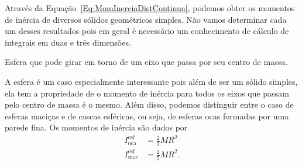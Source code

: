 Através da Equação~\eqref{Eq:MomInerciaDistContinua}, podemos obter os momentos de inércia de diversos sólidos geométricos simples. Não vamos determinar cada um desses resultados pois em geral é necessário um conhecimento de cálculo de integrais em duas e três dimensões.

\begin{description}

\begin{marginfigure}
\centering
{}
\caption{Esfera que pode girar em torno de um eixo que passa por seu centro de massa.}
\end{marginfigure}

    \item[Esfera:] A esfera é um caso especialmente interessante pois além de ser um sólido simples, ela tem a propriedade de o momento de inércia para todos os eixos que passam pelo centro de massa é o mesmo. Além disso, podemos distinguir entre o caso de esferas maciças e de cascas esféricas, ou seja, de esferas ocas formadas por uma parede fina. Os momentos de inércia são dados por
        \begin{align}
            I^{\textrm{esf}}_{\textrm{oca}} &= \frac{2}{3} MR^2 \\
            I^{\textrm{esf}}_{\textrm{mac}} &= \frac{2}{5} MR^2.
        \end{align}
  

\end{description}
